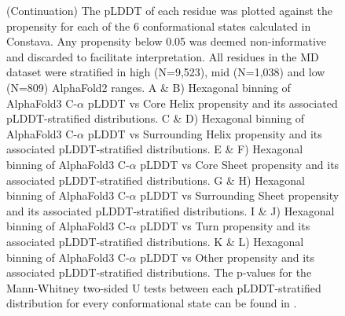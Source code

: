 \begin{figure}[H]
{    %
    }
\label{fig:plddt_vs_constava_propensities}
\end{figure}

\begin{figure}[H]
  \ContinuedFloat
  \caption[]{ (Continuation) The pLDDT of each residue was plotted against the propensity for each of the 6 conformational states calculated in Constava. Any propensity below 0.05 was deemed non-informative and discarded to facilitate interpretation. 
    All residues in the MD dataset were stratified in  high (N=9,523), mid (N=1,038) and low (N=809) AlphaFold2 ranges. 
    A \& B) Hexagonal binning of AlphaFold3 C-$\alpha$ pLDDT vs Core Helix propensity and its associated pLDDT-stratified distributions. 
    C \& D) Hexagonal binning of AlphaFold3 C-$\alpha$ pLDDT vs Surrounding Helix propensity and its associated pLDDT-stratified distributions. 
    E \& F) Hexagonal binning of AlphaFold3 C-$\alpha$ pLDDT vs Core Sheet propensity and its associated pLDDT-stratified distributions. 
    G \& H) Hexagonal binning of AlphaFold3 C-$\alpha$ pLDDT vs Surrounding Sheet propensity and its associated pLDDT-stratified distributions. 
    I \& J) Hexagonal binning of AlphaFold3 C-$\alpha$ pLDDT vs Turn propensity and its associated pLDDT-stratified distributions. 
    K \& L) Hexagonal binning of AlphaFold3 C-$\alpha$ pLDDT vs Other propensity and its associated pLDDT-stratified distributions. 
    The p-values for the Mann-Whitney two-sided U tests between each pLDDT-stratified distribution for every conformational state can be found in .}
\end{figure}

\newpage

